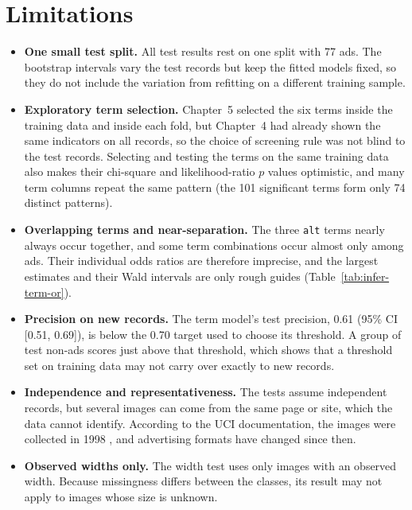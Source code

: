 \section{Limitations}
\begin{itemize}
\item \textbf{One small test split.} All test results rest on one split with
  77 ads. The bootstrap intervals vary the test records but keep the fitted
  models fixed, so they do not include the variation from refitting on a
  different training sample.
\item \textbf{Exploratory term selection.} Chapter~5 selected the six terms
  inside the training data and inside each fold, but Chapter~4 had already
  shown the same indicators on all records, so the choice of screening rule
  was not blind to the test records. Selecting and testing the terms on the
  same training data also makes their chi-square and likelihood-ratio
  $p$ values optimistic, and many term columns repeat the same pattern (the
  101 significant terms form only 74 distinct patterns).
\item \textbf{Overlapping terms and near-separation.} The three \texttt{alt}
  terms nearly always occur together, and some term combinations occur
  almost only among ads. Their individual odds ratios are therefore
  imprecise, and the largest estimates and their Wald intervals are only
  rough guides (Table~\ref{tab:infer-term-or}).
\item \textbf{Precision on new records.} The term model's test precision,
  0.61 (95\% CI [0.51, 0.69]), is below the 0.70 target used to choose its
  threshold. A group of test non-ads scores just above that threshold, which
  shows that a threshold set on training data may not carry over exactly to
  new records.
\item \textbf{Independence and representativeness.} The tests assume
  independent records, but several images can come from the same page or
  site, which the data cannot identify. According to the UCI documentation,
  the images were collected in 1998 \citep{kushmerick1999}, and advertising
  formats have changed since then.
\item \textbf{Observed widths only.} The width test uses only images with an
  observed width. Because missingness differs between the classes, its
  result may not apply to images whose size is unknown.
\end{itemize}

